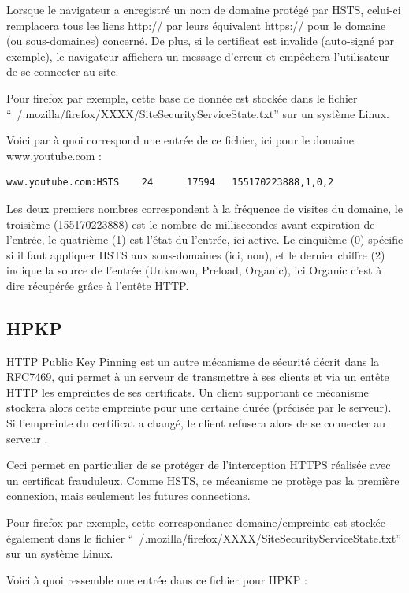 Lorsque le navigateur a enregistré un nom de domaine protégé par HSTS, celui-ci remplacera tous les liens http:// par leurs équivalent https:// pour le domaine (ou sous-domaines) concerné. De plus, si le certificat est invalide (auto-signé par exemple), le navigateur affichera un message d'erreur et empêchera l'utilisateur de se connecter au site.

Pour firefox par exemple, cette base de donnée est stockée dans le fichier ``~/.mozilla/firefox/XXXX/SiteSecurityServiceState.txt'' sur un système Linux.

Voici par à quoi correspond une entrée de ce fichier, ici pour le domaine www.youtube.com :

\begin{verbatim}
www.youtube.com:HSTS    24      17594   155170223888,1,0,2
\end{verbatim}

Les deux premiers nombres correspondent à la fréquence de visites du domaine, le troisième (155170223888) est le nombre de millisecondes avant expiration de l'entrée, le quatrième (1) est l'état du l'entrée, ici active. Le cinquième (0) spécifie si il faut appliquer HSTS aux sous-domaines (ici, non), et le dernier chiffre (2) indique la source de l'entrée (Unknown, Preload, Organic), ici Organic c'est à dire récupérée grâce à l'entête HTTP.

\subsection{HPKP}

HTTP Public Key Pinning est un autre mécanisme de sécurité décrit dans la RFC7469, qui permet à un serveur de transmettre à ses clients et via un entête HTTP les empreintes de ses certificats. Un client supportant ce mécanisme stockera alors cette empreinte pour une certaine durée (précisée par le serveur). Si l'empreinte du certificat a changé, le client refusera alors de se connecter au serveur \cite{hpkp}.

Ceci permet en particulier de se protéger de l'interception HTTPS réalisée avec un certificat frauduleux. Comme HSTS, ce mécanisme ne protège pas la première connexion, mais seulement les futures connections.

Pour firefox par exemple, cette correspondance domaine/empreinte est stockée également dans le fichier ``~/.mozilla/firefox/XXXX/SiteSecurityServiceState.txt'' sur un système Linux.

Voici à quoi ressemble une entrée dans ce fichier pour HPKP :

